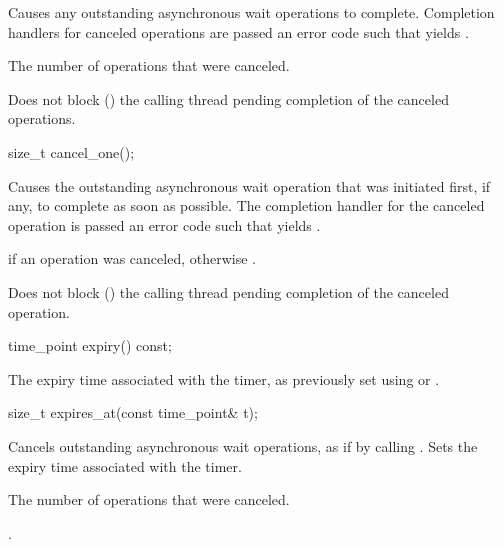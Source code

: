 \begin{itemdescr}
\pnum
\effects Causes any outstanding asynchronous wait operations to complete. Completion handlers for canceled operations are passed an error code  such that  yields .

\pnum
\returns The number of operations that were canceled.

\pnum
\remarks Does not block () the calling thread pending completion of the canceled operations.
\end{itemdescr}

%
\begin{itemdecl}
size_t cancel_one();
\end{itemdecl}

\begin{itemdescr}
\pnum
\effects Causes the outstanding asynchronous wait operation that was initiated first, if any, to complete as soon as possible. The completion handler for the canceled operation is passed an error code  such that  yields .

\pnum
\returns {} if an operation was canceled, otherwise .

\pnum
\remarks Does not block () the calling thread pending completion of the canceled operation.
\end{itemdescr}

%
\begin{itemdecl}
time_point expiry() const;
\end{itemdecl}

\begin{itemdescr}
\pnum
\returns The expiry time associated with the timer, as previously set using  or .
\end{itemdescr}

%
\begin{itemdecl}
size_t expires_at(const time_point& t);
\end{itemdecl}

\begin{itemdescr}
\pnum
\effects Cancels outstanding asynchronous wait operations, as if by calling . Sets the expiry time associated with the timer.

\pnum
\returns The number of operations that were canceled.

\pnum
\postconditions {}.
\end{itemdescr}

